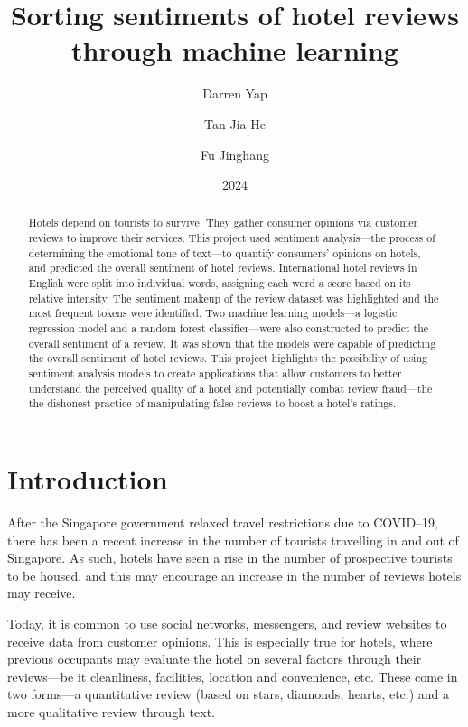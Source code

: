 \documentclass{article}
\title{Sorting sentiments of hotel reviews through machine learning}
\author{Darren Yap \and Tan Jia He \and Fu Jinghang}
\date{2024}
\begin{document}
\pagestyle{scrheadings}

\maketitle
\tableofcontents

\begin{abstract}
	\noindent
	Hotels depend on tourists to survive. They gather consumer opinions via customer
	reviews to improve their services. This project used sentiment analysis---the
	process of determining the emotional tone of text---to quantify consumers'
	opinions on hotels, and predicted the overall sentiment of hotel reviews.
	International hotel reviews in English were split into individual words,
	assigning each word a score based on its relative intensity. The sentiment
	makeup of the review dataset was highlighted and the most frequent tokens were
	identified. Two machine learning models---a logistic regression model and a random
	forest classifier---were also constructed to predict the overall sentiment of a
	review. It was shown that the models were capable of predicting the overall
	sentiment of hotel reviews. This project highlights the possibility of using
	sentiment analysis models to create applications that allow customers to better
	understand the perceived quality of a hotel and potentially combat review fraud---the
	the dishonest practice of manipulating false reviews to boost a hotel's ratings.
\end{abstract}

\section{Introduction}
After the Singapore government relaxed travel restrictions due to COVID--19,
there has been a recent increase in the number of tourists travelling in and out of Singapore.
As such, hotels have seen a rise in the number of prospective tourists to be housed,
and this may encourage an increase in the number of reviews hotels may receive.

Today, it is common to use social networks, messengers, and review websites
to receive data from customer opinions. This is especially true for hotels,
where previous occupants may evaluate the hotel on several factors through their
reviews---be it cleanliness, facilities, location and convenience, etc.
These come in two forms---a quantitative review (based on stars, diamonds,
hearts, etc.) and a more qualitative review through text.
\end{document}
